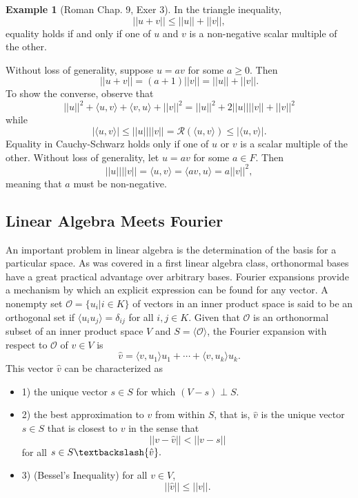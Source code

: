\documentclass[psamsfonts]{amsart}
\theoremstyle{definition}
\newtheorem{exmp}[thm]{Example}
\theoremstyle{remark}
\numberwithin{equation}{section}
\begin{document}
\begin{exmp}[Roman Chap. 9, Exer 3]
In the triangle inequality, 
$$|| u + v || \leq ||u || + || v||, $$
equality holds if and only if one of $u$ and $v$ is a non-negative scalar multiple of the other. 

Without loss of generality, suppose $u = av$ for some $a \geq 0$. Then 
$$||u+v|| = (a+1)||v|| = ||u|| + ||v||.$$
To show the converse, observe that 
$$||u||^2 + \langle u, v \rangle + \langle v, u \rangle + ||v||^2 = ||u||^2 + 2 ||u|| ||v|| + ||v||^2 $$
while 
$$|\langle u, v \rangle | \leq || u || || v|| = \mathcal{R} (\langle u, v \rangle ) \leq | \langle u , v \rangle |.$$
Equality in Cauchy-Schwarz holds only if one of $u$ or $v$ is a scalar multiple of the other. Without loss of generality, let $u = av$ for some $a \in F$. Then 
$$||u|| || v|| = \langle u, v \rangle = \langle av, u \rangle = a || v||^2, $$
meaning that $a$ must be non-negative. 
\end{exmp}


\subsection{Linear Algebra Meets Fourier} An important problem in linear algebra is the determination of the basis for a particular space. As was covered in a first linear algebra class, orthonormal bases have a great practical advantage over arbitrary bases. Fourier expansions provide a mechanism by which an explicit expression can be found for any vector. A nonempty set $\mathcal{O} = \{ u_i | i \in K \}$ of vectors in an inner product space is said to be an orthogonal set if $\langle u_i u_j \rangle = \delta _{ij}$ for all $i, j \in K$. Given that $\mathcal{O}$ is an orthonormal subset of an inner product space $V$ and $S = \langle \mathcal{O} \rangle$, the Fourier expansion with respect to $\mathcal{O}$ of $v \in V$ is 
$$\hat{v} = \langle v, u_1 \rangle u_1 + \cdots + \langle v, u_k \rangle u_k .$$
This vector $\hat{v}$ can be characterized as  
\begin{itemize}
    \item 1) the unique vector $s \in S$ for which $(V-s) \perp S$. 
    \item 2)  the best approximation to $v$ from within $S$, that is, $\hat{v}$ is the unique vector $s \in S$ that is closest to $v$ in the sense that 
    $$|| v - \hat{v} || < ||v - s || $$
    for all $s \in S \textbackslash \{ \hat{v} \}.$
    \item 3) (Bessel's Inequality) for all $v \in V$, 
    $$||\hat{v} || \leq || v ||.  $$
\end{itemize}
\end{document}
